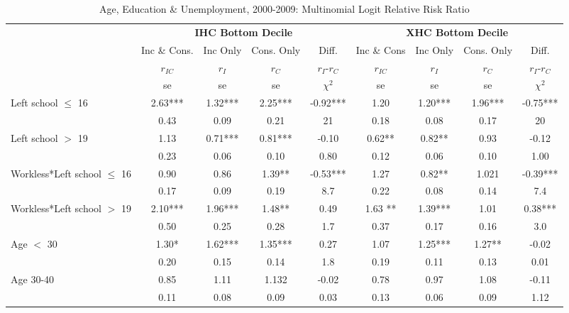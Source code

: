 \begin{table}
\caption{Age, Education \& Unemployment, 2000-2009: Multinomial Logit Relative Risk Ratio}
\centering
\begin{tabular}{l|cccc|cccc}
\hline\hline
	& \multicolumn{4}{c}{\textbf{IHC Bottom Decile}} &  \multicolumn{4}{c}{\textbf{XHC Bottom Decile}} \\
	&	Inc \& Cons.	&	Inc Only	&	Cons. Only	&	Diff.	&	Inc \& Cons	&	Inc Only	&	Cons. Only	&	Diff. 	\\
	&	$r_{IC}$	&	$r_{I}$	&	$r_{C}$ &	$r_{I}$-$r_{C}$&	$r_{IC}$	&	$r_{I}$	&	$r_{C}$	&	$r_{I}$-$r_{C}$\\
 & se & se & se & $\chi^{2}$  & se & se & se & $\chi^{2}$ \\
\hline
Left school $\leq$ 16	&	       2.63***	&	       1.32***	&	       2.25***	&	-0.92***	&	       						1.20   	&	       1.20***  	&	      1.96***	&	-0.75***	\\
                    				&	       0.43   	&	0.09	&	0.21	&	21	&	
			      				 0.18   	&	0.08	&	0.17	&	20	\\
Left school $>$ 19	&	       1.13   	&	       0.71***	&	       0.81*** 	&	-0.10	&	       						0.62**   	&	       0.82** 	&	0.93	&	-0.12	\\
                   	 	&	       0.23   	&	0.06	&	0.10	&	0.80	&	
			  	   0.12   	&	0.06	&	0.10	&	1.00	\\
Workless*Left school $\leq$ 16	&	       0.90   	&	0.86	&	       1.39**  	&	-0.53***	&	       					1.27  	&	       0.82**  	&	1.021	&	-0.39***	\\
                    	&	       0.17   	&	0.09	&	0.19	&	8.7	&
	       0.22   	&	0.08	&	0.14	&	7.4	\\
Workless*Left school $>$ 19	&	       2.10***   	&	       1.96***	&	1.48**	&	0.49	&	       1.63 **  	&	       1.39***	&	1.01	&	0.38***	\\
	&	       0.50   	&	0.25	&	0.28	&	1.7	&
	       0.37   	&	0.17	&	0.16	&	3.0	\\
Age $<$ 30	&	       1.30*  	&	       1.62*** 	&	1.35***	&	0.27	&	
			       1.07   	&	1.25***	&	1.27**	&	-0.02	\\
	&	       0.20   	&	0.15	&	0.14	&	1.8	&	
			    0.19  	&	0.11	&	0.13	&	0.01	\\
Age 30-40	&	       0.85   	&	1.11	&	       1.132 	&	-0.02	&	
			       0.78  	&	      0.97  	&	1.08	&	-0.11	\\
                    	&	       0.11  	&	0.08	&	0.09	&	0.03	&	
			       0.13   	&	0.06	&	0.09	&	1.12	\\

\end{tabular}
\end{table}
